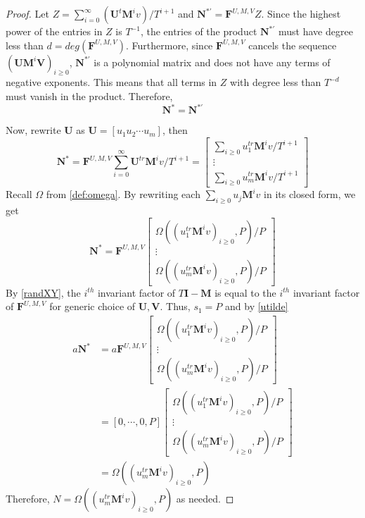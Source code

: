 \documentclass[12pt]{article}
\def\mF{\mathbf{F}}
\def\mI{\mathbf{I}}
\def\mM{\mathbf{M}}
\def\mN{\mathbf{N}}
\def\mU{\mathbf{U}}
\def\mV{\mathbf{V}}
\begin{document}
\begin{proof}
	Let $Z = \sum_{i=0}^{\infty} (\mU^t\mM^iv)/T^{i+1}$ and
	$\mN^{*'} = \mF^{U,M,V} Z$.
	Since the highest power of the entries in 
	$Z$ is $T^{-1}$, the 
	entries of the product $\mN^{*'}$ must have degree less 
	than $d = deg(\mF^{U,M,V})$. Furthermore, since $\mF^{U,M,V}$ cancels 
	the sequence $(\mU\mM^i\mV)_{i \ge 0}$, $\mN^{*'}$ is a
	polynomial matrix and does not have any terms of negative exponents.
	This means that all terms in $Z$ with degree less than $T^{-d}$ must vanish in the
	product.
	Therefore,
	$$ \mN^* = \mN^{*'}$$
	
	Now, rewrite $\mU$ as $\mU = [u_1 u_2 \cdots u_m]$, then
	$$
	\mN^* = \mF^{U,M,V}
	\sum_{i=0}^{\infty} \mU^{tr} \mM^i v / T^{i+1} =
	\begin{bmatrix}
	\sum_{i\ge 0} u_1^{tr}\mM^iv/T^{i+1}\\
	\vdots                   \\
	\sum_{i\ge 0} u_m^{tr}\mM^iv/T^{i+1}
	\end{bmatrix}$$
	Recall $\Omega$ from \cref{def:omega}.
	By rewriting each $\sum_{i\ge0} u_j \mM^i v$ in its closed form, we get
	$$ \mN^* = \mF^{U,M,V}
	\begin{bmatrix}
	\Omega( (u_1^{tr} \mM^i v)_{i\ge 0},P) / P \\
	\vdots      \\
	\Omega((u_m^{tr} \mM^i v)_{i\ge 0},P) / P 
	\end{bmatrix}
	$$
	By \cref{randXY}, the $i^{th}$ invariant factor of
	$T\mI - \mM$ is equal to the $i^{th}$ invariant factor of $\mF^{U,M,V}$ 
	for generic choice of
	$\mU,\mV$. Thus, $s_1 = P$ and by \cref{utilde}
	\begin{align*}
	a \mN^* &= a \mF^{U,M,V}
	\begin{bmatrix}
	\Omega((u_1^{tr} \mM^i v)_{i\ge 0},P) / P \\
	\vdots      \\
	\Omega((u_m^{tr} \mM^i v)_{i\ge 0},P) / P 
	\end{bmatrix}\\
	&= [0,\cdots,0,P]
	\begin{bmatrix}
	\Omega((u_1^{tr} \mM^i v)_{i \ge 0},P) / P \\
	\vdots      \\
	\Omega((u_m^{tr} \mM^i v)_{i\ge 0},P) / P 
	\end{bmatrix}\\
	&= \Omega((u_m^{tr} \mM^i v)_{i\ge 0},P)
	\end{align*}
	Therefore, $N = \Omega(( u_m^{tr} \mM^i v)_{i\ge 0},P)$ as needed.
\end{proof}
\end{document}
